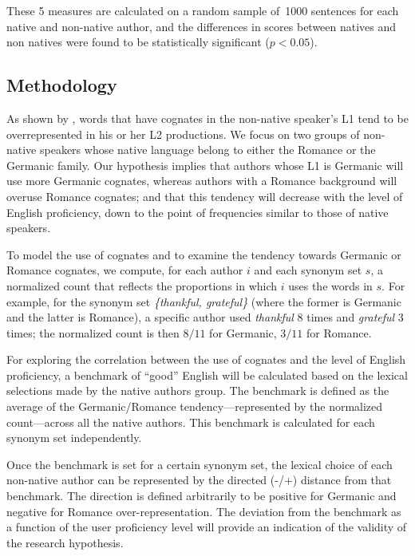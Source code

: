 \documentclass[11pt]{article}
\newcommand{\textnl}{\textsl}
\begin{document}
\noindent
These 5 measures are calculated on a random sample of~1000 sentences for each native and non-native author, and the differences in scores between natives and non natives were found to be statistically significant ($p<0.05$).


\subsection{Methodology}
\label{sec:methodology}

As shown by \citet{TACL1403}, words that have  cognates in the non-native speaker's L1 tend to be overrepresented in his or her L2 productions. We focus on two groups of non-native speakers whose native language belong to either the Romance or the Germanic family. Our hypothesis implies that authors whose L1 is Germanic will use more Germanic cognates, whereas authors with a Romance background will overuse Romance cognates; and that this tendency will decrease with the level of English proficiency, down to the point of frequencies similar to those of native speakers.

To model the use of cognates and to examine the tendency towards Germanic or Romance cognates, we compute, for each author $i$ and each synonym set $s$, a normalized count that reflects the proportions in which $i$ uses the words in $s$. 
For example, for the synonym set \textnl{\{thankful, grateful\}} (where the former is Germanic and the latter is Romance), a specific author used \textnl{thankful} 8 times and \textnl{grateful} 3 times; the normalized count is then $8/11$ for Germanic, $3/11$ for Romance. 

For exploring the correlation between the use of cognates and the level of English proficiency, a benchmark of ``good'' English will be calculated based on the lexical selections made by the native authors group. The benchmark is defined as the average of the Germanic/Romance tendency---represented by the normalized count---across all the native authors. This benchmark is calculated for each synonym set independently. 

Once the benchmark is set for a certain synonym set, the lexical choice of each non-native author can be represented by the directed (-/+) distance from that benchmark. The direction is defined arbitrarily to be positive for Germanic and negative for Romance over-representation.  The deviation from the benchmark as a function of the user proficiency level will provide an indication of the validity of the research hypothesis. 
\end{document}

